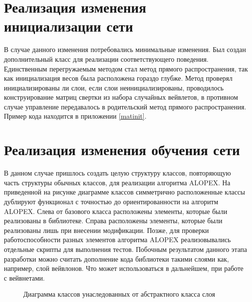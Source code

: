 \documentclass[utf8,usehyperref,14pt]{G7-32}
\begin{document}
\section{Реализация изменения инициализации сети}
В случае данного изменения потребовались минимальные изменения. Был создан дополнительный класс для реализации соответствующего поведения. Единственным перегружаемым методом стал метод прямого распространения, так как инициализация весов была расположена гораздо глубже. Метод проверял инициализированы ли слои, если слои неинициализированы, проводилось конструирование матриц свертки из набора случайных вейвлетов, в противном случае управление передавалось в родительский метод прямого распространения. Пример кода находится в приложении \ref{matinit}.

\section{Реализация изменения обучения сети}
В данном случае пришлось создать целую структуру классов, повторяющую часть структуры обычных классов, для реализации алгоритма ALOPEX. На приведенной на рисунке диаграмме классов симметрично расположенные классы дублируют функционал с точностью до ориентированности на алгоритм ALOPEX. Слева от базового класса расположены элементы, которые были реализованы в библиотеке. Справа расположены элементы, которые были реализованы лишь при внесении модификации. Позже, для проверки работоспособности разных элементов алгоритма ALOPEX реализовывались отдельные скрипты для выполнения тестов. Побочным результатом данного этапа разработки можно считать дополнение кода библиотеки такими слоями как, например, слой вейвлонов. Что может использоваться в дальнейшем, при работе с вейвнетами.
\begin{figure}[H]
  \caption{Диаграмма классов унаследованных от абстрактного класса слоя}\label{layers}
\end{figure}
\end{document}
